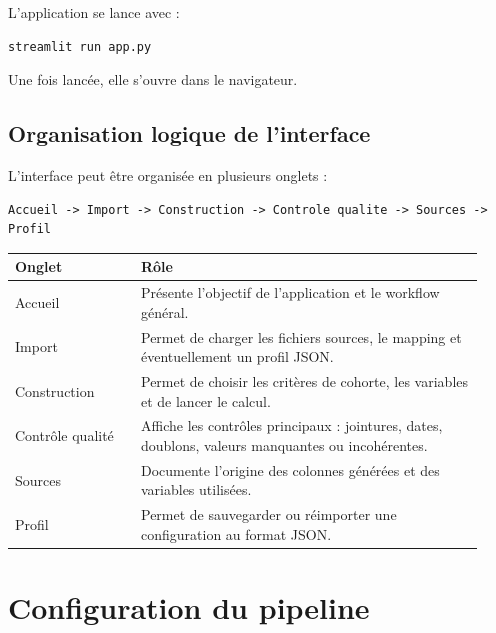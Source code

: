 \documentclass[11pt,a4paper]{article}
\begin{document}
L'application se lance avec :

\begin{lstlisting}
streamlit run app.py
\end{lstlisting}

Une fois lancée, elle s'ouvre dans le navigateur.

\subsection{Organisation logique de l'interface}

L'interface peut être organisée en plusieurs onglets :

\begin{lstlisting}
Accueil -> Import -> Construction -> Controle qualite -> Sources -> Profil
\end{lstlisting}

\begin{longtable}{p{0.25\linewidth} p{0.68\linewidth}}
\toprule
\textbf{Onglet} & \textbf{Rôle} \\
\midrule
\endhead

Accueil &
Présente l'objectif de l'application et le workflow général. \\

Import &
Permet de charger les fichiers sources, le mapping et éventuellement un profil JSON. \\

Construction &
Permet de choisir les critères de cohorte, les variables et de lancer le calcul. \\

Contrôle qualité &
Affiche les contrôles principaux : jointures, dates, doublons, valeurs manquantes ou incohérentes. \\

Sources &
Documente l'origine des colonnes générées et des variables utilisées. \\

Profil &
Permet de sauvegarder ou réimporter une configuration au format JSON. \\

\bottomrule
\end{longtable}

\section{Configuration du pipeline}
\end{document}
